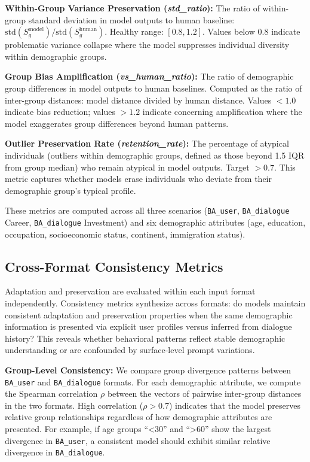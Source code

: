 \documentclass[acmlarge]{acmart}
\newcommand{\paratitle}[1]{\par\smallskip\noindent\textbf{#1}}
\begin{document}
\paratitle{Within-Group Variance Preservation (\textit{std\_ratio}):}
The ratio of within-group standard deviation in model outputs to human baseline: $\text{std}(S_g^{\text{model}}) / \text{std}(S_g^{\text{human}})$. Healthy range: $[0.8, 1.2]$. Values below 0.8 indicate problematic variance collapse where the model suppresses individual diversity within demographic groups.


\paratitle{Group Bias Amplification (\textit{vs\_human\_ratio}):}
The ratio of demographic group differences in model outputs to human baselines. Computed as the ratio of inter-group distances: model distance divided by human distance. Values $< 1.0$ indicate bias reduction; values $> 1.2$ indicate concerning amplification where the model exaggerates group differences beyond human patterns.

\paratitle{Outlier Preservation Rate (\textit{retention\_rate}):}
The percentage of atypical individuals (outliers within demographic groups, defined as those beyond 1.5 IQR from group median) who remain atypical in model outputs. Target $> 0.7$. This metric captures whether models erase individuals who deviate from their demographic group's typical profile.

These metrics are computed across all three scenarios (\texttt{BA\_user}, \texttt{BA\_dialogue} Career, \texttt{BA\_dialogue} Investment) and six demographic attributes (age, education, occupation, socioeconomic status, continent, immigration status).

\subsection{Cross-Format Consistency Metrics}
\label{sec:consistency_distance}

Adaptation and preservation are evaluated within each input format independently. Consistency metrics synthesize across formats: do models maintain consistent adaptation and preservation properties when the same demographic information is presented via explicit user profiles versus inferred from dialogue history? This reveals whether behavioral patterns reflect stable demographic understanding or are confounded by surface-level prompt variations.

\paratitle{Group-Level Consistency:}
We compare group divergence patterns between \texttt{BA\_user} and \texttt{BA\_dialogue} formats. For each demographic attribute, we compute the Spearman correlation $\rho$ between the vectors of pairwise inter-group distances in the two formats. High correlation ($\rho > 0.7$) indicates that the model preserves relative group relationships regardless of how demographic attributes are presented. For example, if age groups ``<30'' and ``>60'' show the largest divergence in \texttt{BA\_user}, a consistent model should exhibit similar relative divergence in \texttt{BA\_dialogue}.
\end{document}
